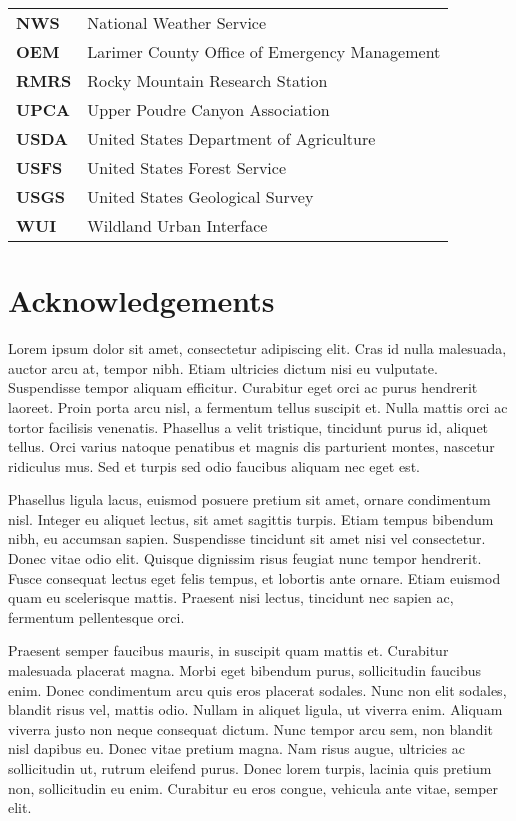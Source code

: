 \documentclass[
]{article}
\begin{document}
\begin{longtable}{>{}ll}
\textbf{NWS} & National Weather Service\\
\addlinespace
\textbf{OEM} & Larimer County Office of Emergency Management\\
\textbf{RMRS} & Rocky Mountain Research Station\\
\textbf{UPCA} & Upper Poudre Canyon Association\\
\textbf{USDA} & United States Department of Agriculture\\
\textbf{USFS} & United States Forest Service\\
\addlinespace
\textbf{USGS} & United States Geological Survey\\
\textbf{WUI} & Wildland Urban Interface\\

\end{longtable}

\clearpage

\section*{Acknowledgements}

Lorem ipsum dolor sit amet, consectetur adipiscing elit. Cras id nulla malesuada, auctor arcu at, tempor nibh. Etiam ultricies dictum nisi eu vulputate. Suspendisse tempor aliquam efficitur. Curabitur eget orci ac purus hendrerit laoreet. Proin porta arcu nisl, a fermentum tellus suscipit et. Nulla mattis orci ac tortor facilisis venenatis. Phasellus a velit tristique, tincidunt purus id, aliquet tellus. Orci varius natoque penatibus et magnis dis parturient montes, nascetur ridiculus mus. Sed et turpis sed odio faucibus aliquam nec eget est.

Phasellus ligula lacus, euismod posuere pretium sit amet, ornare condimentum nisl. Integer eu aliquet lectus, sit amet sagittis turpis. Etiam tempus bibendum nibh, eu accumsan sapien. Suspendisse tincidunt sit amet nisi vel consectetur. Donec vitae odio elit. Quisque dignissim risus feugiat nunc tempor hendrerit. Fusce consequat lectus eget felis tempus, et lobortis ante ornare. Etiam euismod quam eu scelerisque mattis. Praesent nisi lectus, tincidunt nec sapien ac, fermentum pellentesque orci.

Praesent semper faucibus mauris, in suscipit quam mattis et. Curabitur malesuada placerat magna. Morbi eget bibendum purus, sollicitudin faucibus enim. Donec condimentum arcu quis eros placerat sodales. Nunc non elit sodales, blandit risus vel, mattis odio. Nullam in aliquet ligula, ut viverra enim. Aliquam viverra justo non neque consequat dictum. Nunc tempor arcu sem, non blandit nisl dapibus eu. Donec vitae pretium magna. Nam risus augue, ultricies ac sollicitudin ut, rutrum eleifend purus. Donec lorem turpis, lacinia quis pretium non, sollicitudin eu enim. Curabitur eu eros congue, vehicula ante vitae, semper elit.
\end{document}
